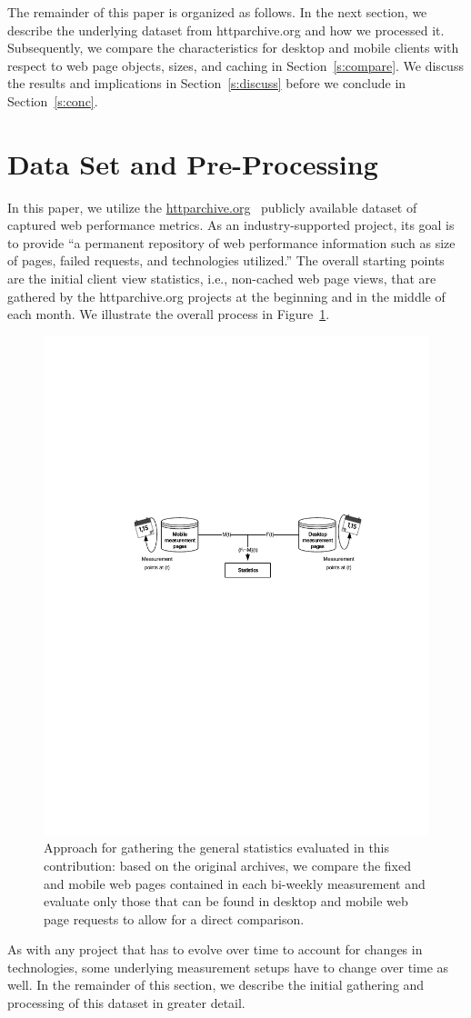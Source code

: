 \documentclass[onecolumn,12pt]{IEEEtran}
\begin{document}
The remainder of this paper is organized as follows. 
In the next section, we describe the underlying dataset from httparchive.org and how we processed it.
Subsequently, we compare the characteristics for desktop and mobile clients with respect to web page objects, sizes, and caching in Section~\ref{s:compare}.
We discuss the results and implications in Section~\ref{s:discuss} before we conclude in Section~\ref{s:conc}.

\section{Data Set and Pre-Processing}
\label{s:dataset}
In this paper, we utilize the \url{httparchive.org}~\cite{ht13} publicly available dataset of captured web performance metrics. 
As an industry-supported project, its goal is to provide ``a permanent repository of web performance information such as size of pages, failed requests, and technologies utilized.''
The overall starting points are the initial client view statistics, i.e., non-cached web page views, that are gathered by the httparchive.org projects at the beginning and in the middle of each month.
We illustrate the overall process in Figure~\ref{fig:setup}.
\begin{figure}
	\centering
	\includegraphics[width=.45\linewidth]{./setup}
	\caption{Approach for gathering the general statistics evaluated in this contribution: based on the original archives, we compare the fixed and mobile web pages contained in each bi-weekly measurement and evaluate only those that can be found in desktop and mobile web page requests to allow for a direct comparison.}
	\label{fig:setup}
\end{figure}
As with any project that has to evolve over time to account for changes in technologies, some underlying measurement setups have to change over time as well.
In the remainder of this section, we describe the initial gathering and processing of this dataset in greater detail.
\end{document}
